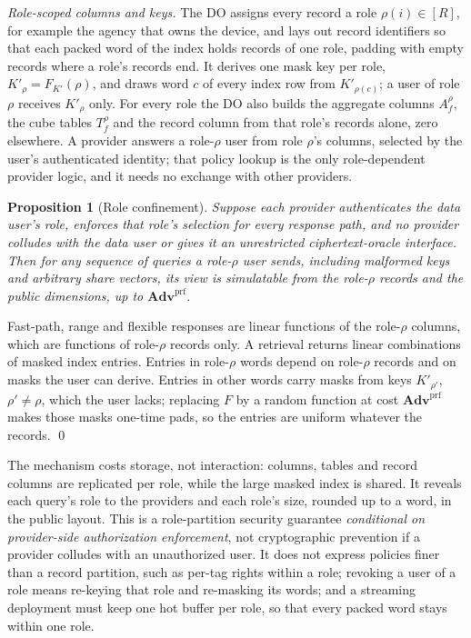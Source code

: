 \documentclass[a4paper,fleqn]{cas-sc}
\newtheorem{proposition}{Proposition}
\newcommand{\advPRF}{\mathbf{Adv}^{\mathrm{prf}}}
\begin{document}
\emph{Role-scoped columns and keys.} The DO assigns every record a role
$\rho(i)\in[R]$, for example the agency that owns the device, and lays out
record identifiers so that each packed word of the index holds records of one
role, padding with empty records where a role's records end. It derives one
mask key per role, $K'_\rho=F_{K'}(\rho)$, and draws word $c$ of every index row
from $K'_{\rho(c)}$; a user of role $\rho$ receives $K'_\rho$ only. For every
role the DO also builds the aggregate columns $A_f^{\rho}$, the cube tables
$T_f^{\rho}$ and the record column from that role's records alone, zero
elsewhere. A provider answers a role-$\rho$ user from role $\rho$'s columns,
selected by the user's authenticated identity; that policy lookup is the only
role-dependent provider logic, and it needs no exchange with other providers.

\begin{proposition}[Role confinement]
\label{prop:role}
Suppose each provider authenticates the data user's role, enforces that
role's selection for \emph{every} response path, and no provider
colludes with the data user or gives it an unrestricted ciphertext-oracle
interface. Then for any sequence of queries a role-$\rho$ user sends,
including malformed keys and arbitrary share vectors, its view is simulatable
from the role-$\rho$ records and the public dimensions, up to
$\advPRF$.
\end{proposition}
\begin{pf}
Fast-path, range and flexible responses are linear functions of the
role-$\rho$ columns, which are functions of role-$\rho$ records only. A
retrieval returns linear combinations of masked index entries. Entries in
role-$\rho$ words depend on role-$\rho$ records and on masks the user can
derive. Entries in other words carry masks from keys $K'_{\rho'}$,
$\rho'\neq\rho$, which the user lacks; replacing $F$ by a random function at
cost $\advPRF$ makes those masks one-time pads, so the entries are uniform
whatever the records. \qed
\end{pf}

The mechanism costs storage, not interaction: columns, tables and record
columns are replicated per role, while the large masked index is shared. It
reveals each query's role to the providers and each role's size, rounded up to
a word, in the public layout. This is a role-partition security guarantee \emph{conditional on provider-side
authorization enforcement}, not cryptographic prevention if a provider
colludes with an unauthorized user. It does not express policies finer
than a record partition, such as per-tag rights within a role;
revoking a user of a role
means re-keying that role and re-masking its words; and a streaming deployment
must keep one hot buffer per role, so that every packed word stays within one
role.
\end{document}
